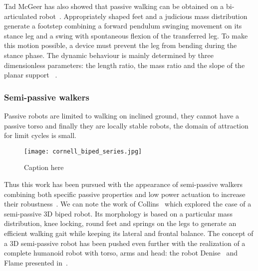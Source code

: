 Tad McGeer has also showed that passive walking can be obtained on a bi-articulated robot~\parencite{mcgeer1992principles}. Appropriately shaped feet  and a judicious mass distribution generate a footstep combining a forward pendulum swinging movement on its stance leg and a swing with spontaneous flexion of the transferred leg. To make this motion possible, a device must prevent the leg from bending during the stance phase.
The dynamic behaviour is mainly determined by three dimensionless parameters: the length ratio, the mass ratio and the slope of the planar support ~\parencite{Garcia1998}.


\subsubsection{Semi-passive walkers} %
Passive robots are limited to walking on inclined ground, they cannot have a passive torso and finally they are locally stable robots, the domain of attraction for limit cycles is small.

\begin{figure}[tb]
    \begin{center}
        \texttt{[image: cornell\_biped\_series.jpg]}
    \end{center}
    \caption{Caption here}
    \label{fig:figure1}
\end{figure}

Thus this work has been pursued with the appearance of semi-passive walkers combining both specific passive properties and low power actuation to increase their robustness~\parencite{Anderson2005}. We can note the work of Collins~\parencite{collins2005bipedal} which explored the case of a semi-passive 3D biped robot. Its morphology is based on a particular mass distribution, knee locking, round feet and springs on the legs to generate an efficient walking gait while keeping its lateral and frontal balance. The concept of a 3D semi-passive robot has been pushed even further with the realization of a complete humanoid robot with torso, arms and head: the robot Denise~\parencite{wisse2005three} and Flame presented in~\parencite{Hobbelen2008}.



